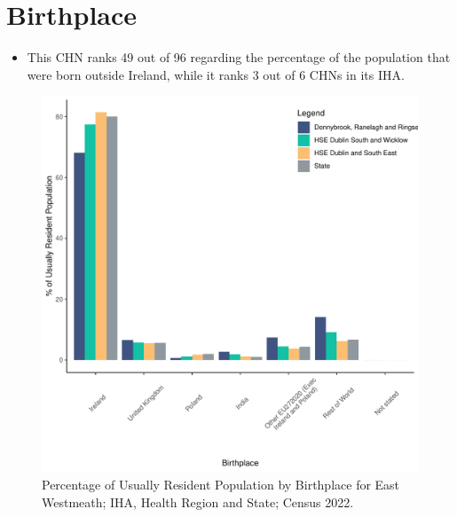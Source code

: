\documentclass{article}
\begin{document}
\section{Birthplace}\label{sect:Birth}
\begin{itemize}
\item This CHN ranks  49 out of 96 regarding the percentage of the population that were born outside Ireland, while it ranks  3 out of 6 CHNs in its IHA.
\end{itemize}
\begin{figure}[H]
	\centering
	\includegraphics[width = 130mm]{../figures/BirthED.pdf}
	\caption{Percentage of Usually Resident Population by Birthplace for East Westmeath; IHA, Health Region and State; Census 2022.}
	\label{fig:vbnv}
	\end{figure}
	
\end{document}
